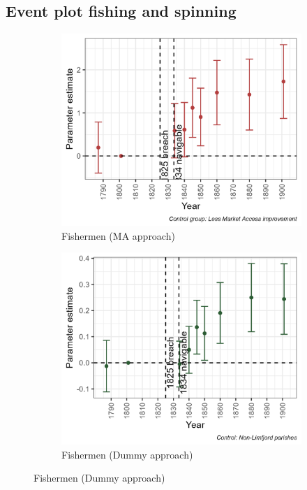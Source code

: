 \subsection{Event plot fishing and spinning}
\begin{figure}
    \centering
    \caption{Fishermen and Spinners, Weavers, Knitters, Dyers And Related Workers}
    \begin{subfigure}[b]{0.45\textwidth}
        \centering
        \caption{Fishermen (MA approach)} \label{fig:fish_ma}
        \includegraphics[width=\textwidth]{Plots/Mechanism/fish_MA.png}
    \end{subfigure}
    \hfill
    \begin{subfigure}[b]{0.45\textwidth}
        \centering
        \caption{Fishermen (Dummy approach)} \label{fig:fish_dummy}
        \includegraphics[width=\textwidth]{Plots/Mechanism/fish_dummy.png}

\end{subfigure}
\end{figure}
